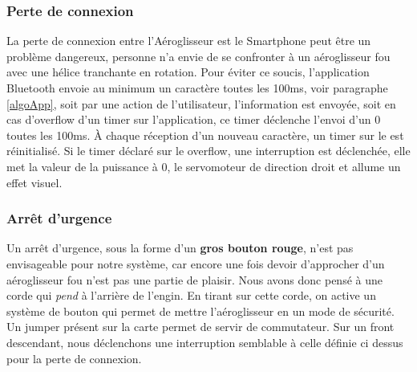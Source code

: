 				\subsubsection{Perte de connexion}
				La perte de connexion entre l'Aéroglisseur est le Smartphone peut être un problème dangereux, personne n'a envie de se confronter à un aéroglisseur fou avec une hélice tranchante en rotation. Pour éviter ce soucis, l'application Bluetooth envoie au minimum un caractère toutes les 100ms, voir paragraphe \ref{algoApp}, soit par une action de l'utilisateur, l'information est envoyée, soit en cas d'overflow d'un timer sur l'application, ce timer déclenche l'envoi d'un 0 toutes les 100ms. À chaque réception d'un nouveau caractère, un timer sur le \pic est réinitialisé. Si le timer déclaré sur le \pic overflow, une interruption est déclenchée, elle met la valeur de la puissance à 0, le servomoteur de direction droit et allume un effet visuel.
				
				\subsubsection{Arrêt d'urgence}\label{AU}
				Un arrêt d'urgence, sous la forme d'un \textbf{gros bouton rouge}, n'est pas envisageable pour notre système, car encore une fois devoir d'approcher d'un aéroglisseur fou n'est pas une partie de plaisir. Nous avons donc pensé à une corde qui \textit{pend} à l'arrière de l'engin. En tirant sur cette corde, on active un système de bouton qui permet de mettre l'aéroglisseur en un mode de sécurité. Un jumper présent sur la carte permet de servir de commutateur. Sur un front descendant, nous déclenchons une interruption semblable à celle définie ci dessus pour la perte de connexion.
				
				
